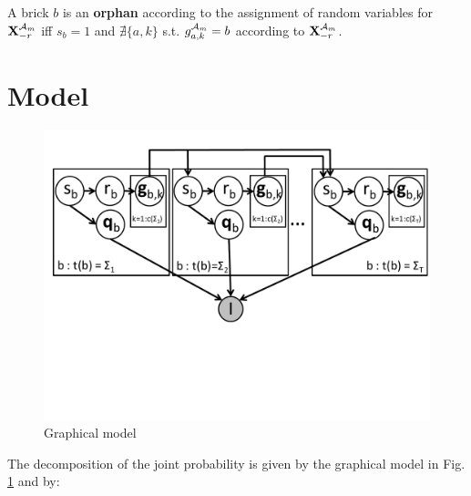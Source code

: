 \documentclass[11pt]{article}
\newcommand{\A}{{\cal A}}
\newcommand{\X}{\mathbf{X}}
\newcommand{\Xrm}{\X^{\Am}_{-r}}
\newcommand{\Am}{\A_{m}}
\newenvironment{definition}[1][Definition]{\begin{trivlist}
\item[\hskip \labelsep {\bfseries #1}]}{\end{trivlist}}
\begin{document}
\begin{definition}
A brick $b$ is an \textbf{orphan} according to the assignment of random variables for $\Xrm$ iff $s_b=1$ and $\nexists \{a,k\}$ s.t. $g^{\Am}_{a,k} = b$ according to $\Xrm$.
\end{definition}


\section{Model}

\begin{figure}[htbp]
\begin{center}
\includegraphics[width=\textwidth, trim=0cm 6cm 0cm 0cm]{gm.pdf}
\caption{Graphical model}
\label{gm}
\end{center}
\end{figure}

\FloatBarrier

The decomposition of the joint probability is given by the graphical model in Fig. \ref{gm} and by: \\
\end{document}
